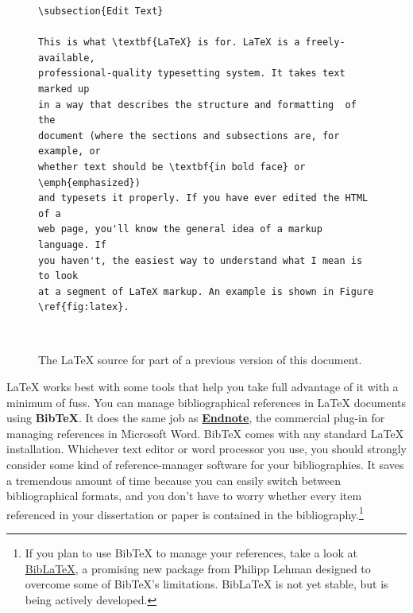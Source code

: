 \documentclass[11pt,article,oneside]{memoir}
\begin{document}
\begin{figure}
\begin{lstlisting}[style=sweave-top]
\end{lstlisting}
\begin{lstlisting}[language={[latex]tex},numbers=none,style=sweave-tex]
\subsection{Edit Text}

This is what \textbf{LaTeX} is for. LaTeX is a freely-available, 
professional-quality typesetting system. It takes text marked up 
in a way that describes the structure and formatting  of the 
document (where the sections and subsections are, for example, or 
whether text should be \textbf{in bold face} or \emph{emphasized}) 
and typesets it properly. If you have ever edited the HTML of a 
web page, you'll know the general idea of a markup language. If 
you haven't, the easiest way to understand what I mean is to look 
at a segment of LaTeX markup. An example is shown in Figure \ref{fig:latex}.
 
\end{lstlisting}
\begin{lstlisting}[style=sweave-bottom]
\end{lstlisting}
\caption{The LaTeX source for part of a previous version of this document.}
\label{fig:latex}
\end{figure}


LaTeX works best with some tools that help you take full advantage of it with a minimum of fuss. You can manage bibliographical references in LaTeX documents using \textbf{BibTeX}. It does the same job as \href{http://www.endnote.com/}{\textbf{Endnote}}, the commercial plug-in for managing references in Microsoft Word. BibTeX comes with any standard LaTeX installation. Whichever text editor or word processor you use, you should strongly consider some kind of reference-manager software for your bibliographies. It saves a tremendous amount of time because you can easily switch between bibliographical formats, and you don't have to worry whether every item referenced in your dissertation or paper is contained in the bibliography.\footnote{If you plan to use BibTeX to manage your references, take a look at  \href{http://www.ctan.org/tex-archive/help/Catalogue/entries/biblatex.html}{BibLaTeX}, a promising new package from Philipp Lehman designed to overcome some of BibTeX's limitations. BibLaTeX is not yet stable, but is being actively developed.}    
\end{document}
